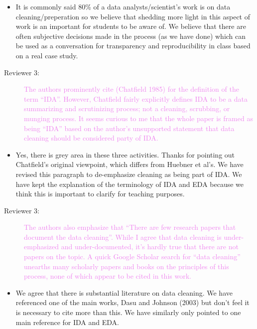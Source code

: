 \documentclass[12pt,a4paper,]{article}
\providecommand{\tightlist}{%
  \setlength{\itemsep}{0pt}\setlength{\parskip}{0pt}}
\begin{document}
\begin{itemize}
\tightlist
\item
  It is commonly said 80\% of a data analysts/scientist's work is on data cleaning/preperation so we believe that shedding more light in this aspect of work is an important for students to be aware of. We believe that there are often subjective decisions made in the process (as we have done) which can be used as a conversation for transparency and reproducibility in class based on a real case study.
\end{itemize}

\begin{description}
\item[Reviewer 3:] \textcolor{violet}{The authors prominently cite (Chatfield 1985) for the definition of the term “IDA”. However, Chatfield fairly explicitly defines IDA to be a data summarizing and scrutinizing process; not a cleaning, scrubbing, or munging process. It seems curious to me that the whole paper is framed as being “IDA” based on the author’s unsupported statement that data cleaning should be considered party of IDA.}
\end{description}

\begin{itemize}
\tightlist
\item
  Yes, there is grey area in these three activities. Thanks for pointing out Chatfield's original viewpoint, which differs from Huebner et al's. We have revised this paragraph to de-emphasize cleaning as being part of IDA. We have kept the explanation of the terminology of IDA and EDA because we think this is important to clarify for teaching purposes.
\end{itemize}

\begin{description}
\item[Reviewer 3:] \textcolor{violet}{The authors also emphasize that “There are few research papers that document the data cleaning”. While I agree that data cleaning is under-emphasized and under-documented, it’s hardly true that there are not papers on the topic. A quick Google Scholar search for “data cleaning” unearths many scholarly papers and books on the principles of this process, none of which appear to be cited in this work.}
\end{description}

\begin{itemize}
\tightlist
\item
  We agree that there is substantial literature on data cleaning. We have referenced one of the main works, Dasu and Johnson (2003) but don't feel it is necessary to cite more than this. We have similarly only pointed to one main reference for IDA and EDA.
\end{itemize}
\end{document}
